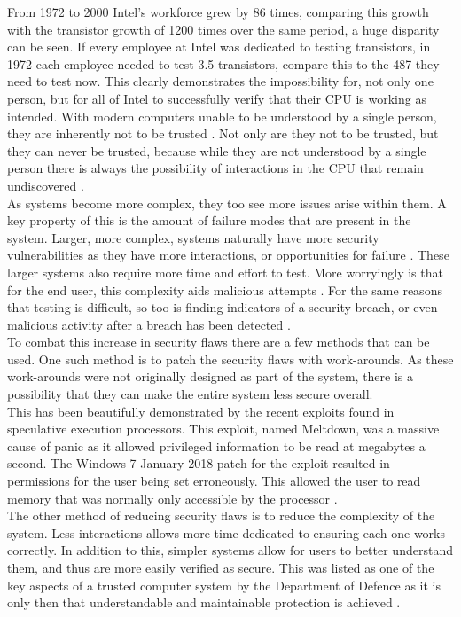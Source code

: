 From 1972 to 2000 Intel’s workforce grew by 86 times, comparing this growth with the transistor growth of 1200 times over the same period, a huge disparity can be seen.
If every employee at Intel was dedicated to testing transistors, in 1972 each employee needed to test 3.5 transistors, compare this to the 487 they need to test now.
This clearly demonstrates the impossibility for, not only one person, but for all of Intel to successfully verify that their CPU is working as intended.
With modern computers unable to be understood by a single person, they are inherently not to be trusted \cite{Reference4}.
Not only are they not to be trusted, but they can never be trusted, because while they are not understood by a single person there is always the possibility of interactions in the CPU that remain undiscovered \cite{Reference5}.\\
As systems become more complex, they too see more issues arise within them.
A key property of this is the amount of failure modes that are present in the system.
Larger, more complex, systems naturally have more security vulnerabilities as they have more interactions, or opportunities for failure \cite{Reference6}.
These larger systems also require more time and effort to test.
More worryingly is that for the end user, this complexity aids malicious attempts \cite{Reference7}.
For the same reasons that testing is difficult, so too is finding indicators of a security breach, or even malicious activity after a breach has been detected \cite{Reference8}.\\
To combat this increase in security flaws there are a few methods that can be used.
One such method is to patch the security flaws with work-arounds.
As these work-arounds were not originally designed as part of the system, there is a possibility that they can make the entire system less secure overall.\\ 
This has been beautifully demonstrated by the recent exploits found in speculative execution processors.
This exploit, named Meltdown, was a massive cause of panic as it allowed privileged information to be read at megabytes a second.
The Windows 7 January 2018 patch for the exploit resulted in permissions for the user being set erroneously.
This allowed the user to read memory that was normally only accessible by the processor \cite{Reference9}.\\
The other method of reducing security flaws is to reduce the complexity of the system.
Less interactions allows more time dedicated to ensuring each one works correctly.
In addition to this, simpler systems allow for users to better understand them, and thus are more easily verified as secure.
This was listed as one of the key aspects of a trusted computer system by the Department of Defence as it is only then that understandable and maintainable protection is achieved \cite{Reference10}.

